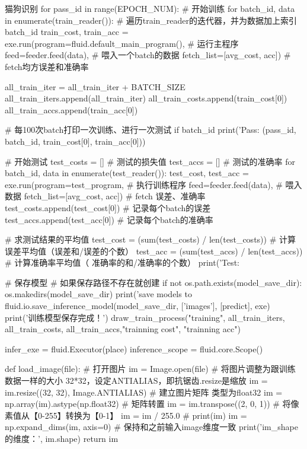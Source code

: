\documentclass[openbib]{article}
\begin{document}
\begin{Python}{猫狗识别}
for pass_id in range(EPOCH_NUM):
	# 开始训练
	for batch_id, data in enumerate(train_reader()):  # 遍历train_reader的迭代器，并为数据加上索引batch_id
		train_cost, train_acc = exe.run(program=fluid.default_main_program(),  # 运行主程序
		feed=feeder.feed(data),  # 喂入一个batch的数据
		fetch_list=[avg_cost, acc])  # fetch均方误差和准确率
		
		all_train_iter = all_train_iter + BATCH_SIZE
		all_train_iters.append(all_train_iter)
		all_train_costs.append(train_cost[0])
		all_train_accs.append(train_acc[0])
	
		# 每100次batch打印一次训练、进行一次测试
		if batch_id %
			print('Pass:%
			(pass_id, batch_id, train_cost[0], train_acc[0]))
	
	# 开始测试
	test_costs = []  # 测试的损失值
	test_accs = []  # 测试的准确率
	for batch_id, data in enumerate(test_reader()):
		test_cost, test_acc = exe.run(program=test_program,  # 执行训练程序
										feed=feeder.feed(data),  # 喂入数据
										fetch_list=[avg_cost, acc])  # fetch 误差、准确率
		test_costs.append(test_cost[0])  # 记录每个batch的误差
		test_accs.append(test_acc[0])  # 记录每个batch的准确率
	
	# 求测试结果的平均值
	test_cost = (sum(test_costs) / len(test_costs))  # 计算误差平均值（误差和/误差的个数）
	test_acc = (sum(test_accs) / len(test_accs))  # 计算准确率平均值（ 准确率的和/准确率的个数）
	print('Test:%

# 保存模型
# 如果保存路径不存在就创建
if not os.path.exists(model_save_dir):
	os.makedirs(model_save_dir)
print('save models to %
fluid.io.save_inference_model(model_save_dir,
								['images'],
								[predict],
								exe)
print('训练模型保存完成！')
draw_train_process("training", all_train_iters, all_train_costs, all_train_accs,"trainning cost", "trainning acc")


infer_exe = fluid.Executor(place)
inference_scope = fluid.core.Scope()

def load_image(file):
	# 打开图片
	im = Image.open(file)
	# 将图片调整为跟训练数据一样的大小  32*32，设定ANTIALIAS，即抗锯齿.resize是缩放
	im = im.resize((32, 32), Image.ANTIALIAS)
	# 建立图片矩阵 类型为float32
	im = np.array(im).astype(np.float32)
	# 矩阵转置
	im = im.transpose((2, 0, 1))
	# 将像素值从【0-255】转换为【0-1】
	im = im / 255.0
	# print(im)
	im = np.expand_dims(im, axis=0)
	# 保持和之前输入image维度一致
	print('im_shape的维度：', im.shape)
	return im




\end{Python}
\end{document}
